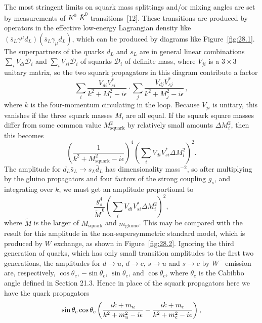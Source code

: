 The most stringent limits on squark mass splittings and/or mixing angles
are set by measurements of \(K^0\)-\(\bar K^0\)
transitions~\hyperref[ch28-ref-12]{[12]}. These transitions are produced
by operators in the effective low-energy Lagrangian density like
\((\bar{s}_L\gamma^\mu d_L)(\bar{s}_L\gamma_\mu d_L)\), which can be
produced by diagrams like Figure~\ref{fig:28.1}. The superpartners of the
quarks \(d_L\) and \(s_L\) are in general linear combinations
\(\sum_iV_{di}\mathcal{D}_i\) and \(\sum_iV_{si}\mathcal{D}_i\) of
squarks \(\mathcal{D}_i\) of definite mass, where \(V_{ji}\) is a
\(3\times3\) unitary matrix, so the two squark propagators in
this diagram contribute a factor
\[
  \sum_i\frac{V_{di}V_{si}^*}{k^2+M_i^2-i\epsilon}
  \mathbin{\cdot}
  \sum_j\frac{V_{dj}V_{sj}^*}{k^2+M_j^2-i\epsilon}\,,
\]
where \(k\) is the four-momentum circulating in the loop. Because
\(V_{ji}\) is unitary, this vanishes if the three squark masses \(M_i\)
are all equal. If the squark square masses differ from some common value
\(M_{\mathrm{squark}}^2\) by relatively small amounts \(\Delta M_i^2\),
then this becomes
\[
  \left(
    \frac{1}{k^2+M_{\mathrm{squark}}^2-i\epsilon}
  \right)^{\!4}
  \left(
    \sum_iV_{di}V_{si}^*\Delta M_i^2
  \right)^{\!2}.
\]
The amplitude for
\(d_L\bar{s}_L\longrightarrow s_L\bar{d}_L\) has dimensionality
mass\(^{-2}\), so after multiplying by the gluino propagators and four
factors of the strong coupling \(g_s\), and integrating over \(k\), we
must get an amplitude proportional to
\begin{equation}
  \frac{g_s^4}{\widetilde{M}^{\,6}}
  \left(
    \sum_iV_{di}V_{si}^*\Delta M_i^2
  \right)^{\!2},
  \tag{28.4.3}\label{eq:28.4.3}
\end{equation}
where \(\widetilde{M}\) is the larger of \(M_{\mathrm{squark}}\) and
\(m_{\mathrm{gluino}}\). This may be compared with the result for this
amplitude in the non-supersymmetric standard model, which is produced by
\(W\) exchange, as shown in Figure~\ref{fig:28.2}. Ignoring the third
generation of quarks, which has only small transition amplitudes to the
first two generations, the amplitudes for \(d\longrightarrow u\),
\(d\longrightarrow c\), \(s\longrightarrow u\) and
\(s\longrightarrow c\) by \(W^-\) emission are, respectively,
\(\cos\theta_c\), \(-\sin\theta_c\), \(\sin\theta_c\), and
\(\cos\theta_c\), where \(\theta_c\) is the Cabibbo angle defined in
Section 21.3. Hence in place of the squark propagators here we have the
quark propagators
\[
  \sin\theta_c\cos\theta_c
  \left(
    \frac{i\sl{k}+m_u}{k^2+m_u^2-i\epsilon}
    -
    \frac{i\sl{k}+m_c}{k^2+m_c^2-i\epsilon}
  \right),
\]
